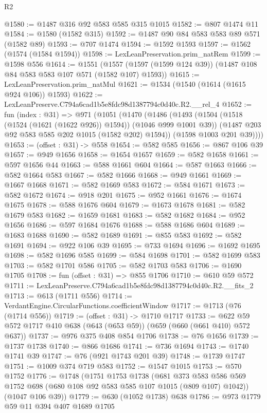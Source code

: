 \begin{lexlean}{R2}
\begin{coremodule}
@1580 := @1487 @316 @92 @583 @585 @315 @1015
@1582 := @807 @1474 @11
@1584 := @1580 (@1582 @315)
@1592 := @1487 @90 @84 @583 @583 @89 @571 (@1582 @89)
@1593 := @707 @1474
@1594 := @1592 @1593
@1597 := @1562 (@1574 (@1584 @1594))
@1598 := LexLeanPreservation.prim_natRem
@1599 := @1598 @556
@1614 := @1551
    (@1557 (@1597 (@1599 @124 @39)) (@1487 @108 @84 @583 @583 @107 @571 (@1582 @107) @1593))
@1615 := LexLeanPreservation.prim_natMul
@1621 := @1534 (@1540 (@1614 (@1615 @924 @106)) @1593)
@1622 := LexLeanPreserve.C794a6cad1b5e8fdc98d1387794c0d40c.R2.__rel_4
@1652 := fun (index : @31) =>
  @971
    (@1051
      (@1470
        (@1486
          (@1493
            (@1504 (@1518 (@1524 (@1621 (@1622 @926)) @1594)) (@1046 @999 @1001 @39))
            (@1487 @203 @92 @583 @585 @202 @1015 (@1582 @202) @1594))
          (@1598 @1003 @201 @39))))
@1653 := (offset : @31) -> @558
@1654 := @582 @585
@1656 := @867 @106 @39
@1657 := @949 @1656
@1658 := @1654 @1657
@1659 := @582 @1658
@1661 := @597 @1656 @44
@1663 := @588 @1661 @604
@1664 := @587 @1663
@1666 := @582 @1664 @583
@1667 := @582 @1666
@1668 := @949 @1661
@1669 := @1667 @1668
@1671 := @582 @1669 @583
@1672 := @584 @1671
@1673 := @582 @1672
@1674 := @918 @201
@1675 := @952 @1661
@1676 := @1674 @1675
@1678 := @588 @1676 @604
@1679 := @1673 @1678
@1681 := @582 @1679 @583
@1682 := @1659 @1681
@1683 := @582 @1682
@1684 := @952 @1656
@1686 := @597 @1684 @1676
@1688 := @588 @1686 @604
@1689 := @1683 @1688
@1690 := @582 @1689
@1691 := @855 @583
@1692 := @582 @1691
@1694 := @922 @106 @39
@1695 := @733 @1694
@1696 := @1692 @1695
@1698 := @582 @1696 @585
@1699 := @584 @1698
@1701 := @582 @1699 @583
@1703 := @582 @1701 @586
@1705 := @582 @1703 @583
@1706 := @1690 @1705
@1708 := fun (offset : @31) => @855 @1706
@1710 := @610 @59 @572
@1711 := LexLeanPreserve.C794a6cad1b5e8fdc98d1387794c0d40c.R2.__fits_2
@1713 := @613 (@1711 @556)
@1714 := VerdantEngine.CircularFunctions.coefficientWindow
@1717 := @1713 (@76 (@1714 @556))
@1719 := (offset : @31) -> @1710 @1717
@1733 := @622 @59 @572 @1717 @410 @638 (@643 (@653 @59)) (@659 (@660 (@661 @410) @572 @637))
@1737 := @976 @375 @408 @854 @1706
@1738 := @76 @1656
@1739 := @1737 @1738
@1740 := @866 @1686
@1741 := @736 @1694
@1743 := @1740 @1741 @39
@1747 := @76 (@921 @1743 @201 @39)
@1748 := @1739 @1747
@1751 := @1009 @374 @719 @583
@1752 := @1547 @1015
@1753 := @570 @1752
@1776 := @1748
    (@1751
      @1753
      @1738
      (@681 @373 @583 @586 @569 @1752 @698 (@680 @108 @92 @583 @585 @107 @1015 (@809 @107) @1042))
      (@1047 @106 @39))
@1779 := @630 (@1052 @1738) @638
@1786 := @973 @1779 @59 @11 @394 @407 @1689 @1705

\end{coremodule}
\end{lexlean}
